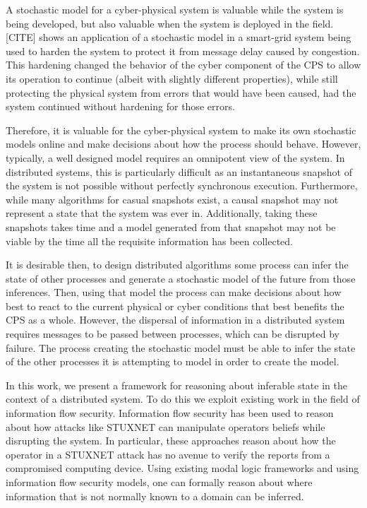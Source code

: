 \documentclass[12pt,oneside]{article}
\begin{document}
A stochastic model for a cyber-physical system is valuable while the system is being developed, but also valuable when the system is deployed in the field. [CITE] shows an application of a stochastic model in a smart-grid system being used to harden the system to protect it from message delay caused by congestion. This hardening changed the behavior of the cyber component of the CPS to allow its operation to continue (albeit with slightly different properties), while still protecting the physical system from errors that would have been caused, had the system continued without hardening for those errors.

Therefore, it is valuable for the cyber-physical system to make its own stochastic models online and make decisions about how the process should behave. However, typically, a well designed model requires an omnipotent view of the system. In distributed systems, this is particularly difficult as an instantaneous snapshot of the system is not possible without perfectly synchronous execution. Furthermore, while many algorithms for casual snapshots exist, a causal snapshot may not represent a state that the system was ever in. Additionally, taking these snapshots takes time and a model generated from that snapshot may not be viable by the time all the requisite information has been collected.

It is desirable then, to design distributed algorithms some process can infer the state of other processes and generate a stochastic model of the future from those inferences. Then, using that model the process can make decisions about how best to react to the current physical or cyber conditions that best benefits the CPS as a whole. However, the dispersal of information in a distributed system requires messages to be passed between processes, which can be disrupted by failure. The process creating the stochastic model must be able to infer the state of the other processes it is attempting to model in order to create the model.

In this work, we present a framework for reasoning about inferable state in the context of a distributed system. To do this we exploit existing work in the field of information flow security. Information flow security has been used to reason about how attacks like STUXNET can manipulate operators beliefs while disrupting the system. In particular, these approaches reason about how the operator in a STUXNET attack has no avenue to verify the reports from a compromised computing device. Using existing modal logic frameworks and using information flow security models, one can formally reason about where information that is not normally known to a domain can be inferred.
\end{document}
